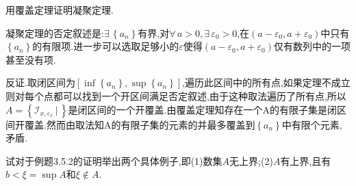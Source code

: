 \documentclass[cn,chinese,founder]{elegantbook}
\begin{document}
      \begin{exercise}
          用覆盖定理证明凝聚定理.
      \end{exercise}
      \begin{solution}
          凝聚定理的否定叙述是:$\exists\, \left\{a_n\right\}$有界,对$\forall\, a>0,\exists\, \varepsilon_0>0$,在$\left(a-\varepsilon_0,a+\varepsilon_0\right)$中只有$\left\{a_n\right\}$的有限项.进一步可以选取足够小的$\varepsilon$使得$\left(a-\varepsilon_0,a+\varepsilon_0\right)$仅有数列中的一项甚至没有项.

          反证.取闭区间为$\left[\inf\left\{a_n\right\},\sup\left\{a_n\right\}\right]$,遍历此区间中的所有点,如果定理不成立则对每个点都可以找到一个开区间满足否定叙述,由于这种取法遍历了所有点,所以$A=\left\{\mathcal{I}_{x,\varepsilon_x}\, |\, \right\}$是闭区间的一个开覆盖.由覆盖定理知存在一个A的有限子集是闭区间开覆盖.然而由取法知A的有限子集的元素的并最多覆盖到$\left\{a_n\right\}$中有限个元素,矛盾.
      \end{solution}

      \begin{exercise}
          试对于例题3.5.2的证明举出两个具体例子,即(1)数集$A$无上界;(2)$A$有上界,且有$b<\xi =\sup A$和$\xi \notin A$.
      \end{exercise}
\end{document}
